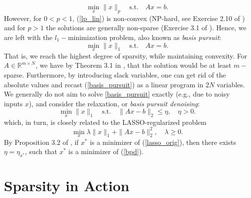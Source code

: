 \documentclass[11pt, twoside]{report}
\begin{document}
\begin{equation} \label{lp_lin}
    \min_x \|x\|_p \quad \text{s.t.} \quad Ax=b.
\end{equation}
However, for $0<p<1$, (\ref{lp_lin}) is non-convex (NP-hard, see Exercise 2.10 of \cite{anha}) and for $p>1$ the solutions are generally non-sparse (Exercise 3.1 of \cite{anha}). Hence, we are left with the $l_1-$minimization problem, also known as \textit{basis pursuit}:
\begin{equation} \label{basis_pursuit}
    \min_x \|x\|_1 \quad \text{s.t.} \quad Ax=b.
\end{equation}
That is, we reach the highest degree of sparsity, while maintaining convexity. For $A \in \mathbb{R}^{m \times N}$, we have by Theorem 3.1 in \cite{anha}, that the solution would be at least $m-$sparse. Furthermore, by introducing slack variables, one can get rid of the absolute values and recast (\ref{basis_pursuit}) as a linear program in $2N$ variables. We generally do not aim to solve \eqref{basis_pursuit} exactly (e.g., due to noisy inputs $x$), and consider the relaxation, or \textit{basis pursuit denoising}:
\begin{equation} \label{bpd}
    \min_x \|x\|_1 \quad \text{s.t.} \quad \|Ax-b\|_2 \leq \eta, \quad \eta>0.
\end{equation}
which, in turn, is closely related to the LASSO-regularized problem
\begin{equation} \label{lasso_orig}
    \min_x \lambda\|x\|_1 + \|Ax-b\|_2^2, \quad \lambda \geq 0.
\end{equation}
By Proposition 3.2 of \cite{anha}, if $x^*$ is a minimizer of (\ref{lasso_orig}), then there exists $\eta = \eta_{x^*}$, such that $x^*$ is a minimizer of (\ref{bpd}).

\section{Sparsity in Action}
\end{document}
